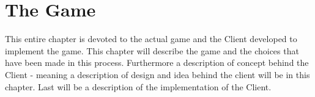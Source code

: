 \chapter{The Game}

This entire chapter is devoted to the actual game and the Client developed to implement the game. This chapter will describe the game and the choices that have been made in this process. Furthermore a description of concept behind the Client - meaning a description of design and idea behind the client will be in this chapter. Last will be a description of the implementation of the Client.




